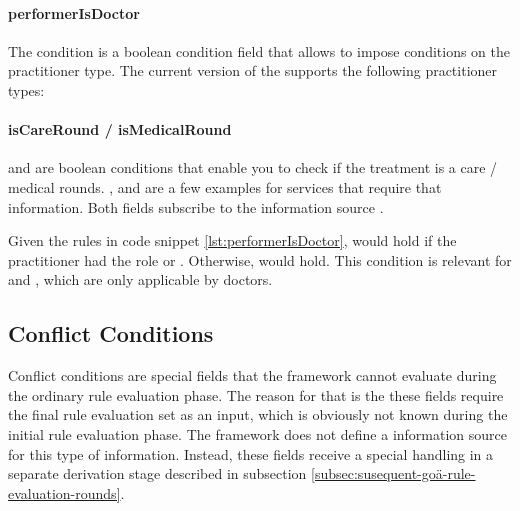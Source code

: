 \paragraph{performerIsDoctor}
The  condition is a boolean condition field that allows to impose conditions on the practitioner type.
The current version of the \AVS supports the following practitioner types:

\paragraph{isCareRound / isMedicalRound}
 and  are boolean conditions that enable you to check if the treatment is a care / medical rounds.
,  and  are a few examples for services that require that information.
Both fields subscribe to the information source .




Given the rules in code snippet \ref{lst:performerIsDoctor},  would hold if the practitioner had the role 
or .
Otherwise,  would hold.
This condition is relevant for  and , which are only applicable by doctors.



\subsection{Conflict Conditions}\label{subsec:conflict-conditions}
Conflict conditions are special fields that the framework cannot evaluate during the ordinary rule evaluation phase.
The reason for that is the these fields require the final rule evaluation set as an input, which is obviously not known during the initial rule evaluation phase.
The framework does not define a information source for this type of information.
Instead, these fields receive a special handling in a separate derivation stage described in subsection \ref{subsec:susequent-goä-rule-evaluation-rounds}.

